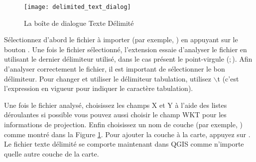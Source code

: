 \begin{figure}[ht]
   \begin{center}
   \texttt{[image: delimited\_text\_dialog]}
   \caption{La boîte de dialogue Texte Délimité \nixcaption}\label{fig:delim_text_plugin_dialog}
   \end{center}  
\end{figure}

Sélectionnez d'abord le fichier à importer (par exemple, ) 
en appuyant sur le bouton . Une fois le fichier 
sélectionné, l'extension essaie d'analyser le fichier en utilisant le dernier 
délimiteur utilisé, dans le cas présent le point-virgule (\mbox{$;$}). 
Afin d'analyser correctement le fichier, il est important de sélectionner le 
bon délimiteur. Pour changer et utiliser le délimiteur tabulation, utilisez \mbox{$\backslash$}t 
(c'est l'expression en vigueur pour indiquer le caractère tabulation).

Une fois le fichier analysé, choisissez les champs X et Y à l'aide des listes 
déroulantes si possible vous pouvez aussi choisir le champ WKT pour les informations 
de projection. Enfin choisissez un nom de couche (par exemple, ) 
comme montré dans la Figure \ref{fig:delim_text_plugin_dialog}. Pour ajouter 
la couche à la carte, appuyez sur . Le fichier texte délimité se 
comporte maintenant dans QGIS comme n'importe quelle autre couche de la carte.
